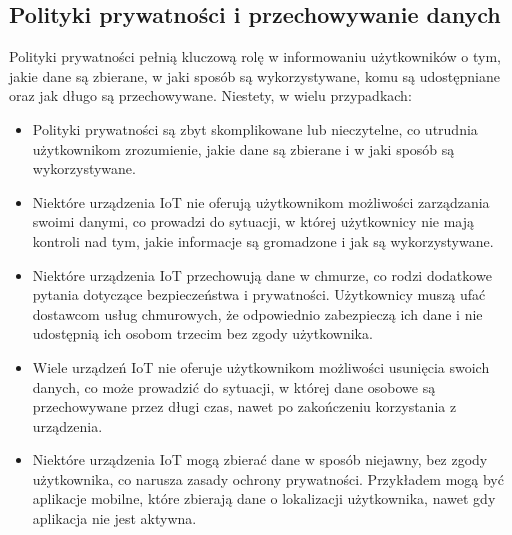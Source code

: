 \subsection{Polityki prywatności i przechowywanie danych}
Polityki prywatności pełnią kluczową rolę w informowaniu użytkowników o tym, jakie dane są zbierane, w jaki sposób są wykorzystywane, komu są udostępniane oraz jak długo są przechowywane. Niestety, w wielu przypadkach:
\begin{itemize}
    \item Polityki prywatności są zbyt skomplikowane lub nieczytelne, co utrudnia użytkownikom zrozumienie, jakie dane są zbierane i w jaki sposób są wykorzystywane.
    
    \item Niektóre urządzenia IoT nie oferują użytkownikom możliwości zarządzania swoimi danymi, co prowadzi do sytuacji, w której użytkownicy nie mają kontroli nad tym, jakie informacje są gromadzone i jak są wykorzystywane.
    
    \item Niektóre urządzenia IoT przechowują dane w chmurze, co rodzi dodatkowe pytania dotyczące bezpieczeństwa i prywatności. Użytkownicy muszą ufać dostawcom usług chmurowych, że odpowiednio zabezpieczą ich dane i nie udostępnią ich osobom trzecim bez zgody użytkownika.
    
    \item Wiele urządzeń IoT nie oferuje użytkownikom możliwości usunięcia swoich danych, co może prowadzić do sytuacji, w której dane osobowe są przechowywane przez długi czas, nawet po zakończeniu korzystania z urządzenia.
    
    \item Niektóre urządzenia IoT mogą zbierać dane w sposób niejawny, bez zgody użytkownika, co narusza zasady ochrony prywatności. Przykładem mogą być aplikacje mobilne, które zbierają dane o lokalizacji użytkownika, nawet gdy aplikacja nie jest aktywna.
\end{itemize}

